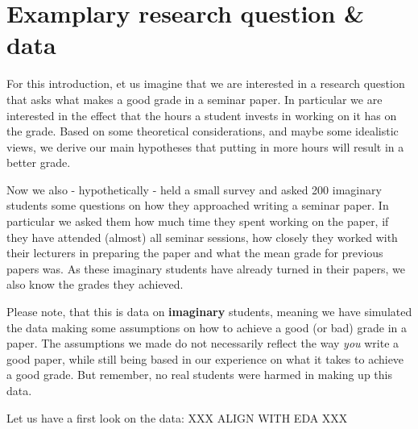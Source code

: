\documentclass[
]{book}
\begin{document}
\hypertarget{examplary-research-question-data}{%
\section{Examplary research question \& data}\label{examplary-research-question-data}}

For this introduction, et us imagine that we are interested in a research
question that asks what makes a good grade in a seminar paper. In particular we
are interested in the effect that the hours a student invests in working on it
has on the grade. Based on some theoretical considerations, and maybe some
idealistic views, we derive our main hypotheses that putting in more hours will
result in a better grade.

Now we also - hypothetically - held a small survey and asked 200 imaginary
students some questions on how they approached writing a seminar paper. In
particular we asked them how much time they spent working on the paper, if they
have attended (almost) all seminar sessions, how closely they worked with their
lecturers in preparing the paper and what the mean grade for previous papers
was. As these imaginary students have already turned in their papers, we also
know the grades they achieved.

Please note, that this is data on \textbf{imaginary} students, meaning we have
simulated the data making some assumptions on how to achieve a good (or bad)
grade in a paper. The assumptions we made do not necessarily reflect the way
\emph{you} write a good paper, while still being based in our experience on what it
takes to achieve a good grade. But remember, no real students were harmed in
making up this data.

Let us have a first look on the data:
XXX ALIGN WITH EDA XXX
\end{document}
